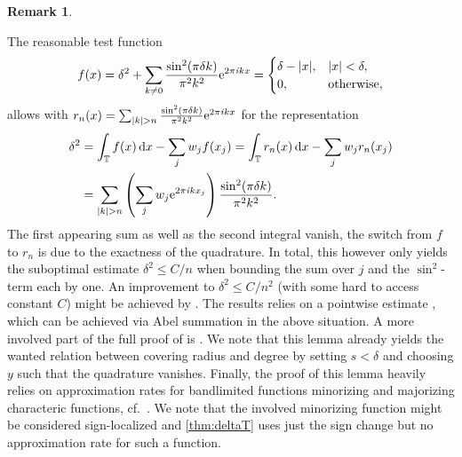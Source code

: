 \documentclass[11pt,a4paper,twoside,final,biblatex]{scrartcl}
\newcommand{\T}{\ensuremath{\mathbb{T}}}
\newcommand{\ii}{\mathit{i}}
\newcommand{\eip}[1]{\textnormal{e}^{2\pi\ii{#1}}}
\renewcommand{\d}{\,\mathrm{d}}
\theoremstyle{definition}
\newtheorem{remark}[theorem]{Remark}
\numberwithin{equation}{section}
\numberwithin{table}{section}
\numberwithin{figure}{section}
\begin{document}
\begin{remark}
\begin{enumerate}
 The reasonable test function
 \begin{align*}
     f(x)
     =\delta^2+\sum_{k\ne 0} \frac{\sin^2(\pi\delta k)}{\pi^2 k^2} \eip{kx}
     =\begin{cases} \delta-|x|,& |x|<\delta,\\
     0,&\text{otherwise},
     \end{cases}
 \end{align*}
 allows with $r_n(x)=\sum_{|k|>n} \frac{\sin^2(\pi\delta k)}{\pi^2 k^2} \eip{kx}$ for the representation
 \begin{align*}
   \delta^2
   &= \int_{\T} f(x)\d x - \sum_j w_j f(x_j)
   =\int_{\T} r_n(x)\d x - \sum_j w_j r_n(x_j)\\
   &= \sum_{|k|>n} \left(\sum_j w_j \eip{kx_j}\right) \frac{\sin^2(\pi\delta k)}
   {\pi^2 k^2}.
 \end{align*}
 The first appearing sum as well as the second integral vanish, the switch from $f$ to $r_n$ is due to the exactness of the quadrature.
 In total, this however only yields the suboptimal estimate $\delta^2\le C/n$ when bounding the sum over $j$ and the $\sin^2$-term each by one.
 An improvement to $\delta^2\le C/n^2$ (with some hard to access constant $C$) might be achieved by \cite[Thm.~2.12]{BaChCoGiSeTr14}.
 The results relies on a pointwise estimate \cite[Lemma 8]{BaChCoGiSeTr14}, which can be achieved via Abel summation in the above situation.
 A more involved part of the full proof of \cite[Thm.~2.12]{BaChCoGiSeTr14} is \cite[Lemma 2.9]{BaChCoGiSeTr14}.
 We note that this lemma already yields the wanted relation between covering radius and degree by setting $s<\delta$ and choosing $y$ such that the quadrature vanishes.
 Finally, the proof of this lemma heavily relies on approximation rates for bandlimited functions minorizing and majorizing characteric functions, cf.~\cite{CoGiTr11}. We note that the involved minorizing function might be considered sign-localized and \cref{thm:deltaT} uses just the sign change but no approximation rate for such a function.
\end{enumerate}
\end{remark}
\end{document}
